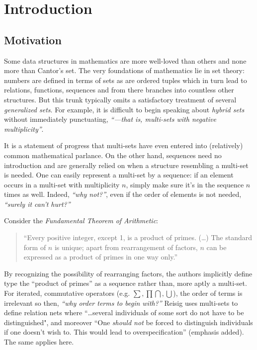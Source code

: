 \chapter{Introduction}
\doublespacing


\section{Motivation}



Some data structures in mathematics are more well-loved than others and none more than Cantor's set.
The very foundations of mathematics lie in set theory: numbers are defined in terms of sets as are ordered tuples which in turn lead to relations, functions, sequences and from there branches into countless other structures.
But this trunk typically omits a satisfactory treatment of several \emph{generalized sets}.
For example, it is difficult to begin speaking about \emph{hybrid sets} without immediately punctuating, 
\emph{``---that is, multi-sets with negative multiplicity''}.


It is a statement of progress that multi-sets have even entered into (relatively) common mathematical parlance.
On the other hand, sequences need no introduction and are generally relied on when a structure resembling a 
multi-set is needed.
One can easily represent a multi-set by a sequence: if an element occurs in a multi-set with multiplicity $n$, simply make
sure it's in the sequence $n$ times as well.
Indeed,  \emph{``why not?''}, even if the order of elements is not needed, \emph{``surely it can't hurt?''}


Consider the \emph{Fundamental Theorem of Arithmetic}:
\begin{quote}
``Every positive integer, except 1, is a product of primes. (\ldots) The standard form of $n$ is unique; apart from rearrangement of factors, $n$ can be expressed as a product of primes in one way only.''
\end{quote}
By recognizing the possibility of rearranging factors, the authors implicitly define type the ``product of primes'' as a sequence rather than, more aptly a multi-set.
For iterated, commutative operators (e.g. $\sum, \prod \bigcap, \bigcup$), the order of terms is irrelevant so then, 
\emph{``why order terms to begin with?''}
Reisig \cite{reisig1985petri} uses multi-sets to define relation nets where 
``\ldots several individuals of some sort do not have to be distinguished", and moreover
 ``One \emph{should not} be forced to distinguish individuals if one doesn't wish to.  This would lead to overspecification''
(emphasis added). The same applies here.

